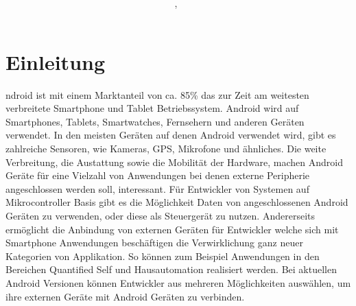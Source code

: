 \documentclass[12pt,journal,compsoc]{IEEEtran}
\begin{document}
\title{\paperTitle \\ \paperSubTitle }
\author{\paperAuthor,~}%



\maketitle

\section{Einleitung}


ndroid ist mit einem Marktanteil von ca. 85\% das zur Zeit am weitesten verbreitete Smartphone und Tablet Betriebssystem.\cite{marketshare}
Android wird auf Smartphones, Tablets, Smartwatches, Fernsehern und anderen Geräten verwendet.
In den meisten Geräten auf denen Android verwendet wird, gibt es zahlreiche Sensoren, wie Kameras, GPS, Mikrofone und ähnliches.
Die weite Verbreitung, die Austattung sowie die Mobilität der Hardware, machen Android Geräte für eine Vielzahl von Anwendungen bei denen externe Peripherie angeschlossen werden soll, interessant.
Für Entwickler von Systemen auf Mikrocontroller Basis gibt es die Möglichkeit Daten von angeschlossenen Android Geräten zu verwenden, oder diese als Steuergerät zu nutzen.
Andererseits ermöglicht die Anbindung von externen Geräten für Entwickler welche sich mit Smartphone Anwendungen beschäftigen die Verwirklichung ganz neuer Kategorien von Applikation. 
So können zum Beispiel Anwendungen in den Bereichen Quantified Self und Hausautomation realisiert werden. 
Bei aktuellen Android Versionen können Entwickler aus mehreren Möglichkeiten auswählen, um ihre externen Geräte mit Android Geräten zu verbinden.
\end{document}
